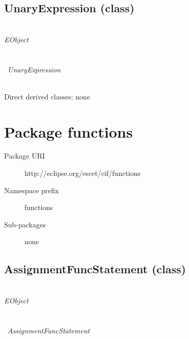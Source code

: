 \subsection{UnaryExpression (class)}\label{cifclass:UnaryExpression}
\clsdocuUnaryExpression

~\\ \noindent \emph{EObject} \\
\hook~ \\
\hookindent\hook~ \\
\hookindent\hookindent\hook~\emph{UnaryExpression}

~\\ \noindent Direct derived classes:
none

\begin{description}
{\featdocuPositionObjectposition}
{\featdocuExpressiontype}
{\featdocuUnaryExpressionchild}
{\featdocuUnaryExpressionoperator}
\end{description}



\section{Package functions}\label{cifpkg:functions}
\pkgdocufunctions

\begin{description}
\item[Package URI] http://eclipse.org/escet/cif/functions
\item[Namespace prefix] functions
\item[Sub-packages] none
\end{description}

\subsection{AssignmentFuncStatement (class)}\label{cifclass:AssignmentFuncStatement}
\clsdocuAssignmentFuncStatement

~\\ \noindent \emph{EObject} \\
\hook~ \\
\hookindent\hook~ \\
\hookindent\hookindent\hook~\emph{AssignmentFuncStatement}


